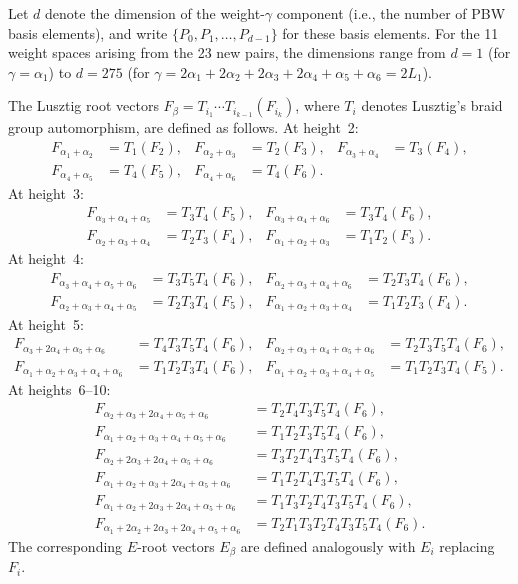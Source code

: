 \documentclass{ximera}
\begin{document}
Let $d$ denote the dimension of the weight-$\gamma$ component (i.e., the number of PBW basis elements), and write $\{P_0, P_1, \ldots, P_{d-1}\}$ for these basis elements. For the 11 weight spaces arising from the 23 new pairs, the dimensions range from $d = 1$ (for $\gamma = \alpha_1$) to $d = 275$ (for $\gamma = 2\alpha_1 + 2\alpha_2 + 2\alpha_3 + 2\alpha_4 + \alpha_5 + \alpha_6 = 2L_1$).

The Lusztig root vectors $F_\beta = T_{i_1} \cdots T_{i_{k-1}}(F_{i_k})$, where $T_i$ denotes Lusztig's braid group automorphism, are defined as follows. At height~2:
\begin{align*}
F_{\alpha_1+\alpha_2} &= T_1(F_2), &
F_{\alpha_2+\alpha_3} &= T_2(F_3), &
F_{\alpha_3+\alpha_4} &= T_3(F_4), \\
F_{\alpha_4+\alpha_5} &= T_4(F_5), &
F_{\alpha_4+\alpha_6} &= T_4(F_6). &
\end{align*}
At height~3:
\begin{align*}
F_{\alpha_3+\alpha_4+\alpha_5} &= T_3 T_4(F_5), &
F_{\alpha_3+\alpha_4+\alpha_6} &= T_3 T_4(F_6), \\
F_{\alpha_2+\alpha_3+\alpha_4} &= T_2 T_3(F_4), &
F_{\alpha_1+\alpha_2+\alpha_3} &= T_1 T_2(F_3).
\end{align*}
At height~4:
\begin{align*}
F_{\alpha_3+\alpha_4+\alpha_5+\alpha_6} &= T_3 T_5 T_4(F_6), &
F_{\alpha_2+\alpha_3+\alpha_4+\alpha_6} &= T_2 T_3 T_4(F_6), \\
F_{\alpha_2+\alpha_3+\alpha_4+\alpha_5} &= T_2 T_3 T_4(F_5), &
F_{\alpha_1+\alpha_2+\alpha_3+\alpha_4} &= T_1 T_2 T_3(F_4).
\end{align*}
At height~5:
\begin{align*}
F_{\alpha_3+2\alpha_4+\alpha_5+\alpha_6} &= T_4 T_3 T_5 T_4(F_6), &
F_{\alpha_2+\alpha_3+\alpha_4+\alpha_5+\alpha_6} &= T_2 T_3 T_5 T_4(F_6), \\
F_{\alpha_1+\alpha_2+\alpha_3+\alpha_4+\alpha_6} &= T_1 T_2 T_3 T_4(F_6), &
F_{\alpha_1+\alpha_2+\alpha_3+\alpha_4+\alpha_5} &= T_1 T_2 T_3 T_4(F_5).
\end{align*}
At heights~6--10:
\begin{align*}
F_{\alpha_2+\alpha_3+2\alpha_4+\alpha_5+\alpha_6} &= T_2 T_4 T_3 T_5 T_4(F_6), \\
F_{\alpha_1+\alpha_2+\alpha_3+\alpha_4+\alpha_5+\alpha_6} &= T_1 T_2 T_3 T_5 T_4(F_6), \\
F_{\alpha_2+2\alpha_3+2\alpha_4+\alpha_5+\alpha_6} &= T_3 T_2 T_4 T_3 T_5 T_4(F_6), \\
F_{\alpha_1+\alpha_2+\alpha_3+2\alpha_4+\alpha_5+\alpha_6} &= T_1 T_2 T_4 T_3 T_5 T_4(F_6), \\
F_{\alpha_1+\alpha_2+2\alpha_3+2\alpha_4+\alpha_5+\alpha_6} &= T_1 T_3 T_2 T_4 T_3 T_5 T_4(F_6), \\
F_{\alpha_1+2\alpha_2+2\alpha_3+2\alpha_4+\alpha_5+\alpha_6} &= T_2 T_1 T_3 T_2 T_4 T_3 T_5 T_4(F_6).
\end{align*}
The corresponding $E$-root vectors $E_\beta$ are defined analogously with $E_i$ replacing $F_i$.
\end{document}
